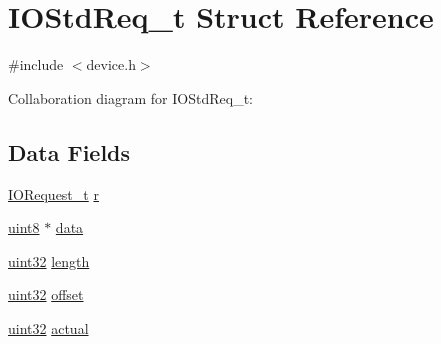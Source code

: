 \hypertarget{structIOStdReq__t}{\section{I\+O\+Std\+Req\+\_\+t Struct Reference}
\label{structIOStdReq__t}
}


{\ttfamily \#include $<$device.\+h$>$}



Collaboration diagram for I\+O\+Std\+Req\+\_\+t\+:
\subsection*{Data Fields}
\begin{DoxyCompactItemize}
\item 
\hyperlink{structIORequest__t}{I\+O\+Request\+\_\+t} \hyperlink{structIOStdReq__t_a030e2acd54e401431b9b82eb3b17f6b2}{r}
\item 
\hyperlink{type_8h_a33a5e996e7a90acefb8b1c0bea47e365}{uint8} $\ast$ \hyperlink{structIOStdReq__t_a51d84e106324bf16e5025f25f64dfa7a}{data}
\item 
\hyperlink{type_8h_acbd4acd0d29e2d6c43104827f77d9cd2}{uint32} \hyperlink{structIOStdReq__t_ab328102b93e774e71cc13df74d9d13ae}{length}
\item 
\hyperlink{type_8h_acbd4acd0d29e2d6c43104827f77d9cd2}{uint32} \hyperlink{structIOStdReq__t_aa378339ba7159ca11ce04e9f18ba8a73}{offset}
\item 
\hyperlink{type_8h_acbd4acd0d29e2d6c43104827f77d9cd2}{uint32} \hyperlink{structIOStdReq__t_a7f5298d830e99dbc9787b8d01df25ebf}{actual}
\end{DoxyCompactItemize}


